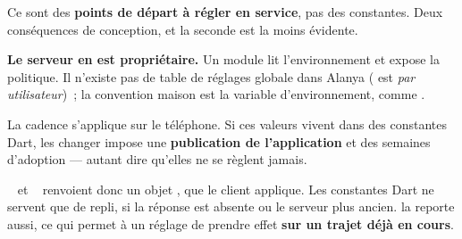 Ce sont des \textbf{points de départ à régler en service}, pas des constantes. Deux
conséquences de conception, et la seconde est la moins évidente.

\textbf{Le serveur en est propriétaire.} Un module
 lit l'environnement et expose la
politique. Il n'existe pas de table de réglages globale dans Alanya
( est \emph{par utilisateur})~; la convention maison est la
variable d'environnement, comme .

\begin{alerte}
La cadence s'applique sur le téléphone. Si ces valeurs vivent dans des constantes Dart,
les changer impose une \textbf{publication de l'application} et des semaines d'adoption ---
autant dire qu'elles ne se règlent jamais.

\mPOST{}~ et \mGET{}~ renvoient donc un objet
, que le client applique. Les constantes Dart ne servent que de repli, si la
réponse est absente ou le serveur plus ancien.  la reporte aussi, ce qui
permet à un réglage de prendre effet \textbf{sur un trajet déjà en cours}.
\end{alerte}

